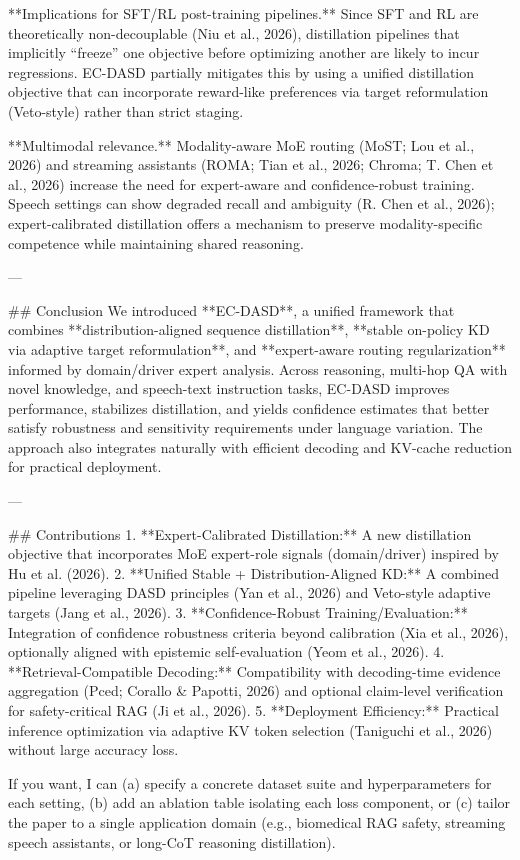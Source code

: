 **Implications for SFT/RL post-training pipelines.** Since SFT and RL are theoretically non-decouplable (Niu et al., 2026), distillation pipelines that implicitly “freeze” one objective before optimizing another are likely to incur regressions. EC-DASD partially mitigates this by using a unified distillation objective that can incorporate reward-like preferences via target reformulation (Veto-style) rather than strict staging.

**Multimodal relevance.** Modality-aware MoE routing (MoST; Lou et al., 2026) and streaming assistants (ROMA; Tian et al., 2026; Chroma; T. Chen et al., 2026) increase the need for expert-aware and confidence-robust training. Speech settings can show degraded recall and ambiguity (R. Chen et al., 2026); expert-calibrated distillation offers a mechanism to preserve modality-specific competence while maintaining shared reasoning.

---

## Conclusion  
We introduced **EC-DASD**, a unified framework that combines **distribution-aligned sequence distillation**, **stable on-policy KD via adaptive target reformulation**, and **expert-aware routing regularization** informed by domain/driver expert analysis. Across reasoning, multi-hop QA with novel knowledge, and speech-text instruction tasks, EC-DASD improves performance, stabilizes distillation, and yields confidence estimates that better satisfy robustness and sensitivity requirements under language variation. The approach also integrates naturally with efficient decoding and KV-cache reduction for practical deployment.

---

## Contributions  
1. **Expert-Calibrated Distillation:** A new distillation objective that incorporates MoE expert-role signals (domain/driver) inspired by Hu et al. (2026).  
2. **Unified Stable + Distribution-Aligned KD:** A combined pipeline leveraging DASD principles (Yan et al., 2026) and Veto-style adaptive targets (Jang et al., 2026).  
3. **Confidence-Robust Training/Evaluation:** Integration of confidence robustness criteria beyond calibration (Xia et al., 2026), optionally aligned with epistemic self-evaluation (Yeom et al., 2026).  
4. **Retrieval-Compatible Decoding:** Compatibility with decoding-time evidence aggregation (Pced; Corallo & Papotti, 2026) and optional claim-level verification for safety-critical RAG (Ji et al., 2026).  
5. **Deployment Efficiency:** Practical inference optimization via adaptive KV token selection (Taniguchi et al., 2026) without large accuracy loss.

If you want, I can (a) specify a concrete dataset suite and hyperparameters for each setting, (b) add an ablation table isolating each loss component, or (c) tailor the paper to a single application domain (e.g., biomedical RAG safety, streaming speech assistants, or long-CoT reasoning distillation).